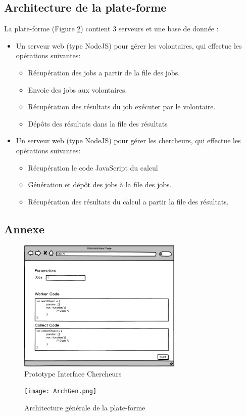 \documentclass[a4paper]{article}
\begin{document}
\subsection{Architecture de la plate-forme}
La plate-forme (Figure \ref{fig:ArchGenarale}) contient 3 serveurs et une base de donnée :
\begin{itemize}
\item Un serveur web (type NodeJS) pour gérer les volontaires, qui effectue les opérations suivantes:
\begin{itemize}
\item Récupération des jobs a partir de la file des jobs.
\item Envoie des jobs aux volontaires.
\item Récupération des résultats du job exécuter par le volontaire.
\item Dépôts des résultats dans la file des résultats
\end{itemize} 
\item Un serveur web (type NodeJS) pour gérer les chercheurs, qui effectue les opérations suivantes:
\begin{itemize}
\item Récupération le code JavaScript du calcul
\item Génération et dépôt des jobs à la file des jobs.
\item Récupération des résultats du calcul a partir la file des résultats.
\end{itemize} 

\end{itemize}  


\subsection{Annexe}
\begin{figure}
\centering
\includegraphics[width=0.7\textwidth]{calc1.png}
\caption{\label{fig:ProtoChercheur}Prototype Interface Chercheurs}
\end{figure}
\begin{figure}
\centering
\texttt{[image: ArchGen.png]}
\caption{\label{fig:ArchGenarale}Architecture générale de la plate-forme}
\end{figure}
\end{document}
